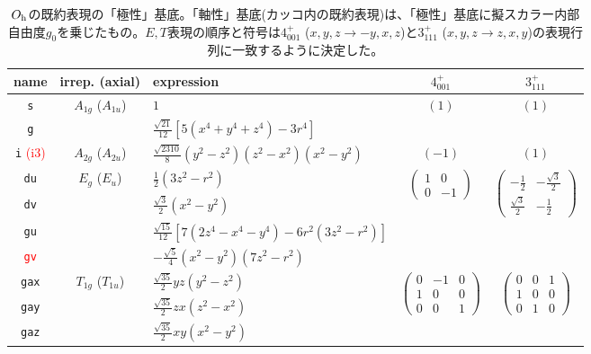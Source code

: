 \documentclass[11pt]{easymemo}
\begin{document}
\begin{table}[ht!]
\small
\begin{center}
\caption{$O_{\rm h}$の既約表現の「極性」基底。「軸性」基底(カッコ内の既約表現)は、「極性」基底に擬スカラー内部自由度$g_{0}$を乗じたもの。$E,T$表現の順序と符号は$4_{001}^{+}$ ($x,y,z\to -y,x,z$)と$3_{111}^{+}$ ($x,y,z\to z,x,y$)の表現行列に一致するように決定した。}
\label{tbl:4}
\renewcommand{\arraystretch}{1.4}
\begin{tabular}{cclcc} \hline\hline
name & irrep. (axial) & expression & $4_{001}^{+}$ & $3_{111}^{+}$ \\ \hline
{\tt s} & $A_{1g}$ ($A_{1u}$) & $1$ & $(1)$ & $(1)$ \\
{\tt g} & & $\frac{\sqrt{21}}{12}[5(x^4+y^4+z^4)-3r^4]$ & & \\ \hline
{\tt i} \textcolor{red}{(i3)} & $A_{2g}$ ($A_{2u}$) & $\frac{\sqrt{2310}}{8}(y^{2}-z^{2})(z^{2}-x^{2})(x^{2}-y^{2})$ & $(-1)$ & $(1)$ \\ \hline
{\tt du} & $E_{g}$ ($E_{u}$) & $\frac{1}{2}(3z^{2}-r^{2})$ & \multirow{2}{*}{$\begin{pmatrix} 1 & 0 \\ 0 & -1 \end{pmatrix}$} & \multirow{2}{*}{$\begin{pmatrix} -\frac{1}{2} & -\frac{\sqrt{3}}{2} \\ \frac{\sqrt{3}}{2} & -\frac{1}{2} \end{pmatrix}$} \\
{\tt dv} & & $\frac{\sqrt{3}}{2}(x^{2}-y^{2})$ \\
{\tt gu} & & $\frac{\sqrt{15}}{12}[7(2z^4-x^4-y^4)-6r^2(3z^2-r^2)]$ & & \\
\textcolor{red}{{\tt gv}} & & $-\frac{\sqrt{5}}{4}(x^2-y^2)(7z^2-r^2)$ & & \\ \hline
{\tt gax} & $T_{1g}$ ($T_{1u}$) & $\frac{\sqrt{35}}{2}yz(y^{2} - z^{2})$ & \multirow{3}{*}{$\begin{pmatrix}0&-1&0\\1&0&0\\0&0&1\end{pmatrix}$} & \multirow{3}{*}{$\begin{pmatrix}0&0&1\\1&0&0\\0&1&0\end{pmatrix}$} \\
{\tt gay} & & $\frac{\sqrt{35}}{2}zx(z^{2}-x^{2})$ \\
{\tt gaz} & & $\frac{\sqrt{35}}{2}xy(x^{2}-y^{2})$ \\ \hline

\end{tabular}
\end{center}
\end{table}
\end{document}

